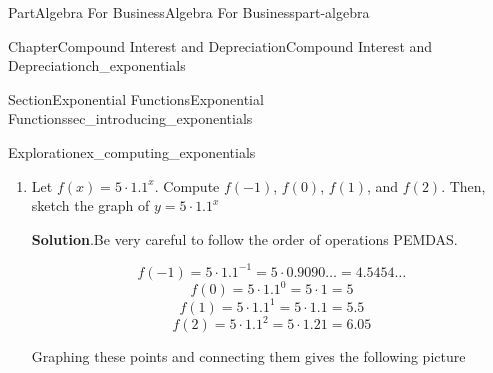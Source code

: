 \documentclass{tufte-book}
\newcommand{\blocktitlefont}{\relax}
\numberwithin{equation}{chapter}
\begin{document}
\begin{partptx}{Part}{Algebra For Business}{}{Algebra For Business}{}{}{part-algebra}
\begin{chapterptx}{Chapter}{Compound Interest and Depreciation}{}{Compound Interest and Depreciation}{}{}{ch_exponentials}
\begin{sectionptx}{Section}{Exponential Functions}{}{Exponential Functions}{}{}{sec_introducing_exponentials}
\begin{exploration}{Exploration}{}{ex_computing_exponentials}
\begin{enumerate}[font=\bfseries,label=(\alph*),ref=\alph*]
\begin{image}{0.25}{0.5}{0.25}{}
{
}%
\end{image}%
\item{}Let \(f(x) = 5\cdot 1.1^x\). Compute  \(f(-1)\), \(f(0)\), \(f(1)\), and \(f(2)\). Then, sketch the graph of \(y=5\cdot 1.1^x\)%
\par\smallskip%
\noindent\textbf{\blocktitlefont Solution}.\hypertarget{ex_computing_exponentials-2-2}{}\quad{}Be very careful to follow the order of operations PEMDAS.%
\par
%
\begin{equation*}
f(-1) = 5\cdot 1.1^{-1} = 5 \cdot 0.9090\dots = 4.5454\dots
\end{equation*}
%
\begin{equation*}
f(0) = 5\cdot 1.1^{0} = 5 \cdot 1 = 5
\end{equation*}
%
\begin{equation*}
f(1) = 5\cdot 1.1^{1} = 5 \cdot 1.1 = 5.5
\end{equation*}
%
\begin{equation*}
f(2) = 5\cdot 1.1^{2} = 5 \cdot 1.21 = 6.05
\end{equation*}
%
\par
Graphing these points and connecting them gives the following picture%
\begin{image}{0.25}{0.5}{0.25}{}%
\end{image}
\end{enumerate}
\end{exploration}
\end{sectionptx}
\end{chapterptx}
\end{partptx}
\end{document}
